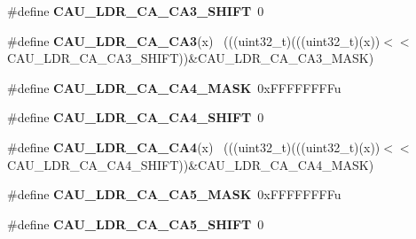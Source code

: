 \begin{DoxyCompactItemize}
\item 
\hypertarget{group___c_a_u___register___masks_ga31b5ff2083be706bf9f333d80d4992fc}{}\#define {\bfseries C\+A\+U\+\_\+\+L\+D\+R\+\_\+\+C\+A\+\_\+\+C\+A3\+\_\+\+S\+H\+I\+F\+T}~0\label{group___c_a_u___register___masks_ga31b5ff2083be706bf9f333d80d4992fc}

\item 
\hypertarget{group___c_a_u___register___masks_gae925d7039216807e29b68889e2a5939b}{}\#define {\bfseries C\+A\+U\+\_\+\+L\+D\+R\+\_\+\+C\+A\+\_\+\+C\+A3}(x)                                            ~(((uint32\+\_\+t)(((uint32\+\_\+t)(x))$<$$<$C\+A\+U\+\_\+\+L\+D\+R\+\_\+\+C\+A\+\_\+\+C\+A3\+\_\+\+S\+H\+I\+F\+T))\&C\+A\+U\+\_\+\+L\+D\+R\+\_\+\+C\+A\+\_\+\+C\+A3\+\_\+\+M\+A\+S\+K)\label{group___c_a_u___register___masks_gae925d7039216807e29b68889e2a5939b}

\item 
\hypertarget{group___c_a_u___register___masks_gae6080270193ec350954328f66ffc6526}{}\#define {\bfseries C\+A\+U\+\_\+\+L\+D\+R\+\_\+\+C\+A\+\_\+\+C\+A4\+\_\+\+M\+A\+S\+K}~0x\+F\+F\+F\+F\+F\+F\+F\+Fu\label{group___c_a_u___register___masks_gae6080270193ec350954328f66ffc6526}

\item 
\hypertarget{group___c_a_u___register___masks_ga401e274bfc5075ec0e72d885071c3415}{}\#define {\bfseries C\+A\+U\+\_\+\+L\+D\+R\+\_\+\+C\+A\+\_\+\+C\+A4\+\_\+\+S\+H\+I\+F\+T}~0\label{group___c_a_u___register___masks_ga401e274bfc5075ec0e72d885071c3415}

\item 
\hypertarget{group___c_a_u___register___masks_ga10b6d0abd3b4972abee238df0461df9e}{}\#define {\bfseries C\+A\+U\+\_\+\+L\+D\+R\+\_\+\+C\+A\+\_\+\+C\+A4}(x)                                            ~(((uint32\+\_\+t)(((uint32\+\_\+t)(x))$<$$<$C\+A\+U\+\_\+\+L\+D\+R\+\_\+\+C\+A\+\_\+\+C\+A4\+\_\+\+S\+H\+I\+F\+T))\&C\+A\+U\+\_\+\+L\+D\+R\+\_\+\+C\+A\+\_\+\+C\+A4\+\_\+\+M\+A\+S\+K)\label{group___c_a_u___register___masks_ga10b6d0abd3b4972abee238df0461df9e}

\item 
\hypertarget{group___c_a_u___register___masks_gafb0c705253f6e6bde84a7d415b022364}{}\#define {\bfseries C\+A\+U\+\_\+\+L\+D\+R\+\_\+\+C\+A\+\_\+\+C\+A5\+\_\+\+M\+A\+S\+K}~0x\+F\+F\+F\+F\+F\+F\+F\+Fu\label{group___c_a_u___register___masks_gafb0c705253f6e6bde84a7d415b022364}

\item 
\hypertarget{group___c_a_u___register___masks_gaac2d34d8c6a22632b669e944970f7318}{}\#define {\bfseries C\+A\+U\+\_\+\+L\+D\+R\+\_\+\+C\+A\+\_\+\+C\+A5\+\_\+\+S\+H\+I\+F\+T}~0\label{group___c_a_u___register___masks_gaac2d34d8c6a22632b669e944970f7318}


\end{DoxyCompactItemize}
